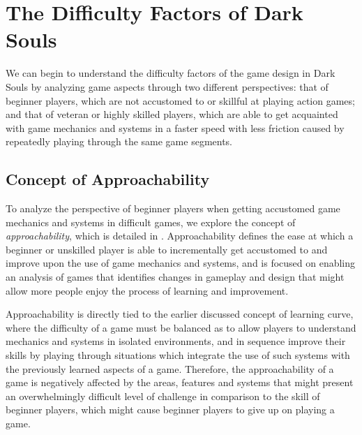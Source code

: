 
\section{The Difficulty Factors of Dark Souls}
\label{sec:pain-points-dark-souls}


We can begin to understand the difficulty factors of the game design in Dark Souls by analyzing game aspects through two different perspectives: that of beginner players, which are not accustomed to or skillful at playing action games; and that of veteran or highly skilled players, which are able to get acquainted with game mechanics and systems in a faster speed with less friction caused by repeatedly playing through the same game segments.

\subsection{Concept of Approachability}

To analyze the perspective of beginner players when getting accustomed game mechanics and systems in difficult games, we explore the concept of \emph{approachability}, which is detailed in \cite{ONLINE_AcessibilityInGameDesign}. Approachability defines the ease at which a beginner or unskilled player is able to incrementally get accustomed to and improve upon the use of game mechanics and systems, and is focused on enabling an analysis of games that identifies changes in gameplay and design that might allow more people enjoy the process of learning and improvement.

Approachability is directly tied to the earlier discussed concept of learning curve, where the difficulty of a game must be balanced as to allow players to understand mechanics and systems in isolated environments, and in sequence improve their skills by playing through situations which integrate the use of such systems with the previously learned aspects of a game. Therefore, the approachability of a game is negatively affected by the areas, features and systems that might present an overwhelmingly difficult level of challenge in comparison to the skill of beginner players, which might cause beginner players to give up on playing a game.

